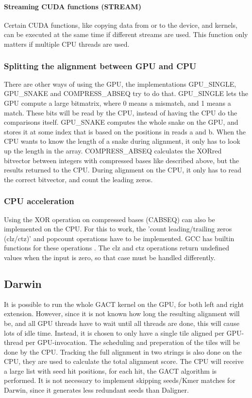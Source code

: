 \documentclass[../main/thesis.tex]{subfiles}
\begin{document}
\paragraph{Streaming CUDA functions (STREAM)}
Certain CUDA functions, like copying data from or to the device, and kernels, can be executed at the same time if different streams are used.
This function only matters if multiple CPU threads are used.

\subsubsection{Splitting the alignment between GPU and CPU}
There are other ways of using the GPU, the implementations GPU\_SINGLE, GPU\_SNAKE and COMPRESS\_ABSEQ try to do that.
GPU\_SINGLE lets the GPU compute a large bitmatrix, where 0 means a mismatch, and 1 means a match.
These bits will be read by the CPU, instead of having the CPU do the comparisons itself.
GPU\_SNAKE computes the whole snake on the GPU, and stores it at some index that is based on the positions in reads a and b.
When the CPU wants to know the length of a snake during alignment, it only has to look up the length in the array.
COMPRESS\_ABSEQ calculates the XORred bitvector between integers with compressed bases like described above, but the results returned to the CPU.
During alignment on the CPU, it only has to read the correct bitvector, and count the leading zeros.

\subsubsection{CPU acceleration}
Using the XOR operation on compressed bases (CABSEQ) can also be implemented on the CPU.
For this to work, the 'count leading/trailing zeros (clz/ctz)' and popcount operations have to be implemented.
GCC has builtin functions for these operations \cite{GCC}.
The clz and ctz operations return undefined values when the input is zero, so that case must be handled differently.


\subsection{Darwin}
It is possible to run the whole GACT kernel on the GPU, for both left and right extension.
However, since it is not known how long the resulting alignment will be, and all GPU threads have to wait until all threads are done, this will cause lots of idle time.
Instead, it is chosen to only have a single tile aligned per GPU-thread per GPU-invocation.
The scheduling and preperation of the tiles will be done by the CPU.
Tracking the full alignment in two strings is also done on the CPU, they are used to calculate the total alignment score.
The CPU will receive a large list with seed hit positions, for each hit, the GACT algorithm is performed.
It is not necessary to implement skipping seeds/Kmer matches for Darwin, since it generates less redundant seeds than Daligner.
\end{document}
